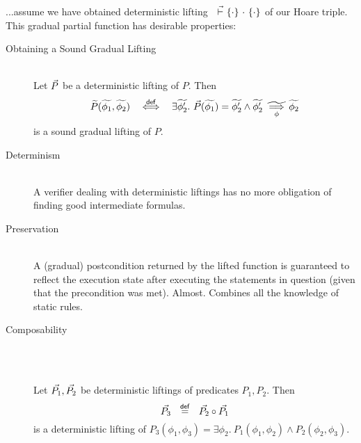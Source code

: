 ...assume we have obtained deterministic lifting ${~} \,\,\vec{\vdash}\,\, \{{\cdot}\} ~{\cdot}~ \{{\cdot}\}$ of our Hoare triple. %
This gradual partial function has desirable properties: %


\begin{description}
    \item[Obtaining a Sound Gradual Lifting]
    \begin{lemma}~\\
        Let $\vec{P}$ be a deterministic lifting of $P$.
        Then
        \begin{displaymath}
        \widetilde{P}(\widetilde{\phi_1}, \widetilde{\phi_2}) ~~\overset{\textup{\textsf{def}}}{\iff}~~ \exists \widetilde{\phi_2'}.~ \vec{P}(\widetilde{\phi_1}) = \widetilde{\phi_2'} \wedge {\widetilde{\phi_2'}} \,\,\underset{\phi}{\widetilde{\implies}}\, {\widetilde{\phi_2}}
        \end{displaymath}
        is a sound gradual lifting of $P$.
    \end{lemma}
    
    \item[Determinism]~\\
    A verifier dealing with deterministic liftings has no more obligation of finding good intermediate formulas.
    
    \item[Preservation]~\\
    A (gradual) postcondition returned by the lifted function is guaranteed to reflect the execution state after executing the statements in question (given that the precondition was met). Almost.
    Combines all the knowledge of static rules.
    
    \item[Composability]~\\
    \begin{lemma}~\\
        Let $\vec{P_1}, \vec{P_2}$ be deterministic liftings of predicates $P_1, P_2$.
        Then
        \begin{displaymath}
        \vec{P_3} ~~\overset{\textup{\textsf{def}}}{=}~~ \vec{P_2} \circ \vec{P_1}
        \end{displaymath}
        is a deterministic lifting of $P_3(\phi_1, \phi_3) = \exists \phi_2.~ P_1(\phi_1, \phi_2) \wedge P_2(\phi_2, \phi_3)$.
    \end{lemma}
\end{description}

